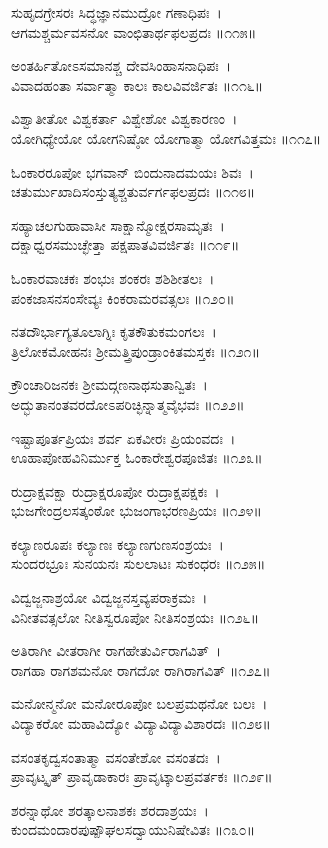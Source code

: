 ಸುಹೃದಗ್ರೇಸರಃ ಸಿದ್ಧಜ್ಞಾನಮುದ್ರೋ ಗಣಾಧಿಪಃ~।\\
ಆಗಮಶ್ಚರ್ಮವಸನೋ ವಾಂಛಿತಾರ್ಥಫಲಪ್ರದಃ ॥೧೧೫॥

	ಅಂತರ್ಹಿತೋಽಸಮಾನಶ್ಚ ದೇವಸಿಂಹಾಸನಾಧಿಪಃ~।\\
	ವಿವಾದಹಂತಾ ಸರ್ವಾತ್ಮಾ ಕಾಲಃ ಕಾಲವಿವರ್ಜಿತಃ ॥೧೧೬॥

ವಿಶ್ವಾತೀತೋ ವಿಶ್ವಕರ್ತಾ ವಿಶ್ವೇಶೋ ವಿಶ್ವಕಾರಣಂ~।\\
ಯೋಗಿಧ್ಯೇಯೋ ಯೋಗನಿಷ್ಠೋ ಯೋಗಾತ್ಮಾ ಯೋಗವಿತ್ತಮಃ ॥೧೧೭॥

	ಓಂಕಾರರೂಪೋ ಭಗವಾನ್ ಬಿಂದುನಾದಮಯಃ ಶಿವಃ~।\\
	ಚತುರ್ಮುಖಾದಿಸಂಸ್ತುತ್ಯಶ್ಚತುರ್ವರ್ಗಫಲಪ್ರದಃ ॥೧೧೮॥

ಸಹ್ಯಾಚಲಗುಹಾವಾಸೀ ಸಾಕ್ಷಾನ್ಮೋಕ್ಷರಸಾಮೃತಃ~।\\
ದಕ್ಷಾಧ್ವರಸಮುಚ್ಛೇತ್ತಾ ಪಕ್ಷಪಾತವಿವರ್ಜಿತಃ ॥೧೧೯॥

	ಓಂಕಾರವಾಚಕಃ ಶಂಭುಃ ಶಂಕರಃ ಶಶಿಶೀತಲಃ~।\\
	ಪಂಕಜಾಸನಸಂಸೇವ್ಯಃ ಕಿಂಕರಾಮರವತ್ಸಲಃ ॥೧೨೦॥

ನತದೌರ್ಭಾಗ್ಯತೂಲಾಗ್ನಿಃ ಕೃತಕೌತುಕಮಂಗಲಃ~।\\
ತ್ರಿಲೋಕಮೋಹನಃ ಶ್ರೀಮತ್ತ್ರಿಪುಂಡ್ರಾಂಕಿತಮಸ್ತಕಃ ॥೧೨೧॥

	ಕ್ರೌಂಚಾರಿಜನಕಃ ಶ್ರೀಮದ್ಗಣನಾಥಸುತಾನ್ವಿತಃ~।\\
	ಅದ್ಭುತಾನಂತವರದೋಽಪರಿಚ್ಛಿನ್ನಾತ್ಮವೈಭವಃ ॥೧೨೨॥

ಇಷ್ಟಾಪೂರ್ತಪ್ರಿಯಃ ಶರ್ವ ಏಕವೀರಃ ಪ್ರಿಯಂವದಃ~।\\
ಊಹಾಪೋಹವಿನಿರ್ಮುಕ್ತ ಓಂಕಾರೇಶ್ವರಪೂಜಿತಃ ॥೧೨೩॥

	ರುದ್ರಾಕ್ಷವಕ್ಷಾ ರುದ್ರಾಕ್ಷರೂಪೋ ರುದ್ರಾಕ್ಷಪಕ್ಷಕಃ~।\\
	ಭುಜಗೇಂದ್ರಲಸತ್ಕಂಠೋ ಭುಜಂಗಾಭರಣಪ್ರಿಯಃ ॥೧೨೪॥

ಕಲ್ಯಾಣರೂಪಃ ಕಲ್ಯಾಣಃ ಕಲ್ಯಾಣಗುಣಸಂಶ್ರಯಃ~।\\
ಸುಂದರಭ್ರೂಃ ಸುನಯನಃ ಸುಲಲಾಟಃ ಸುಕಂಧರಃ ॥೧೨೫॥

	ವಿದ್ವಜ್ಜನಾಶ್ರಯೋ ವಿದ್ವಜ್ಜನಸ್ತವ್ಯಪರಾಕ್ರಮಃ~।\\
	ವಿನೀತವತ್ಸಲೋ ನೀತಿಸ್ವರೂಪೋ ನೀತಿಸಂಶ್ರಯಃ ॥೧೨೬॥

ಅತಿರಾಗೀ ವೀತರಾಗೀ ರಾಗಹೇತುರ್ವಿರಾಗವಿತ್~।\\
ರಾಗಹಾ ರಾಗಶಮನೋ ರಾಗದೋ ರಾಗಿರಾಗವಿತ್ ॥೧೨೭॥

	ಮನೋನ್ಮನೋ ಮನೋರೂಪೋ ಬಲಪ್ರಮಥನೋ ಬಲಃ~।\\
	ವಿದ್ಯಾಕರೋ ಮಹಾವಿದ್ಯೋ ವಿದ್ಯಾವಿದ್ಯಾವಿಶಾರದಃ ॥೧೨೮॥

ವಸಂತಕೃದ್ವಸಂತಾತ್ಮಾ ವಸಂತೇಶೋ ವಸಂತದಃ~।\\
ಪ್ರಾವೃಟ್ಕೃತ್ ಪ್ರಾವೃಡಾಕಾರಃ ಪ್ರಾವೃಟ್ಕಾಲಪ್ರವರ್ತಕಃ ॥೧೨೯॥

	ಶರನ್ನಾಥೋ ಶರತ್ಕಾಲನಾಶಕಃ ಶರದಾಶ್ರಯಃ~।\\
	ಕುಂದಮಂದಾರಪುಷ್ಪೌಘಲಸದ್ವಾಯುನಿಷೇವಿತಃ ॥೧೩೦॥

